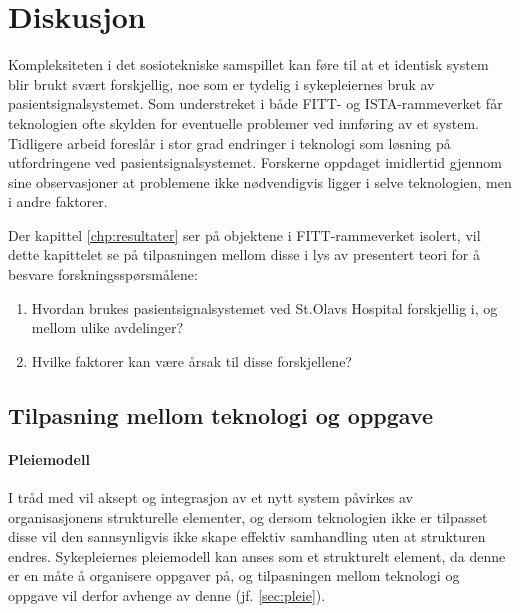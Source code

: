 \chapter{Diskusjon}
\label{chp:diskusjon}
Kompleksiteten i det sosiotekniske samspillet kan føre til at et identisk system blir brukt svært forskjellig, noe som er tydelig i sykepleiernes bruk av pasientsignalsystemet. Som understreket i både FITT- og ISTA-rammeverket får teknologien ofte skylden for eventuelle problemer ved innføring av et system. Tidligere arbeid foreslår i stor grad endringer i teknologi som løsning på utfordringene ved pasientsignalsystemet. Forskerne oppdaget imidlertid gjennom sine observasjoner at problemene ikke nødvendigvis ligger i selve teknologien, men i andre faktorer. 

\noindent
Der kapittel \ref{chp:resultater} ser på objektene i FITT-rammeverket isolert, vil dette kapittelet se på tilpasningen mellom disse i lys av presentert teori for å besvare forskningsspørsmålene:

\begin{enumerate}
\item Hvordan brukes pasientsignalsystemet ved St.Olavs Hospital forskjellig i, og mellom ulike avdelinger? 
\item Hvilke faktorer kan være årsak til disse forskjellene?
\end{enumerate}

\section{Tilpasning mellom teknologi og oppgave}	

\subsubsection{Pleiemodell}	
I tråd med \citet{Orlikowski92} vil aksept og integrasjon av et nytt system påvirkes av organisasjonens strukturelle elementer, og dersom teknologien ikke er tilpasset disse vil den sannsynligvis ikke skape effektiv samhandling uten at strukturen endres. Sykepleiernes pleiemodell kan anses som et strukturelt element, da denne er en måte å organisere oppgaver på, og tilpasningen mellom teknologi og oppgave vil derfor avhenge av denne (jf. \ref{sec:pleie}).

